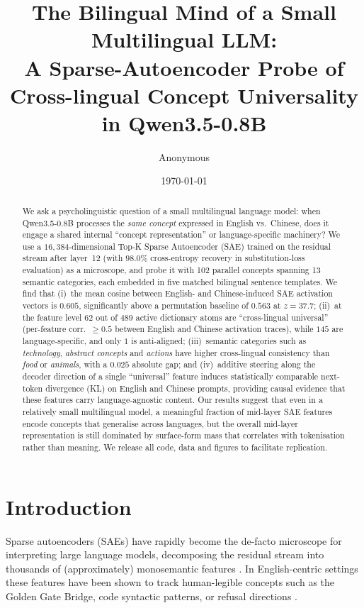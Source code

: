 \documentclass[11pt,a4paper]{article}
\title{The Bilingual Mind of a Small Multilingual LLM:\\
\large A Sparse-Autoencoder Probe of Cross-lingual Concept Universality in Qwen3.5-0.8B}
\author{Anonymous}
\date{\today}
\begin{document}
\maketitle

\begin{abstract}
\noindent
We ask a psycholinguistic question of a small multilingual language model: when
Qwen3.5-0.8B processes the \emph{same concept} expressed in English vs.\
Chinese, does it engage a shared internal ``concept representation'' or
language-specific machinery? We use a $16{,}384$-dimensional Top-K Sparse
Autoencoder (SAE) trained on the residual stream after layer~12 (with $98.0\%$
cross-entropy recovery in substitution-loss evaluation) as a microscope, and
probe it with 102 parallel concepts spanning 13 semantic categories, each
embedded in five matched bilingual sentence templates. We find that (i)~the
mean cosine between English- and Chinese-induced SAE activation vectors is
$0.605$, significantly above a permutation baseline of $0.563$ at
$z=37.7$; (ii)~at the feature level $62$ out of $489$ active dictionary atoms
are ``cross-lingual universal'' (per-feature corr.\ $\geq 0.5$ between English
and Chinese activation traces), while $145$ are language-specific, and only
$1$ is anti-aligned; (iii)~semantic categories such as
\emph{technology}, \emph{abstract concepts} and \emph{actions} have higher
cross-lingual consistency than \emph{food} or \emph{animals}, with a $0.025$
absolute gap; and (iv)~additive steering along the decoder direction of a
single ``universal'' feature induces statistically comparable next-token
divergence (KL) on English and Chinese prompts, providing causal evidence that
these features carry language-agnostic content. Our results suggest that even
in a relatively small multilingual model, a meaningful fraction of mid-layer
SAE features encode concepts that generalise across languages, but the
overall mid-layer representation is still dominated by surface-form mass that
correlates with tokenisation rather than meaning. We release all code, data
and figures to facilitate replication.
\end{abstract}

\section{Introduction}

Sparse autoencoders (SAEs) have rapidly become the de-facto microscope for
interpreting large language models, decomposing the residual stream into
thousands of (approximately) monosemantic features
\cite{bricken2023monosemanticity,cunningham2023sparseautoencoders,gao2024scalingsae,templeton2024scalingmonosemanticity}.
In English-centric settings these features have been shown to track
human-legible concepts such as the Golden Gate Bridge, code syntactic
patterns, or refusal directions \cite{templeton2024scalingmonosemanticity}.
\end{document}
